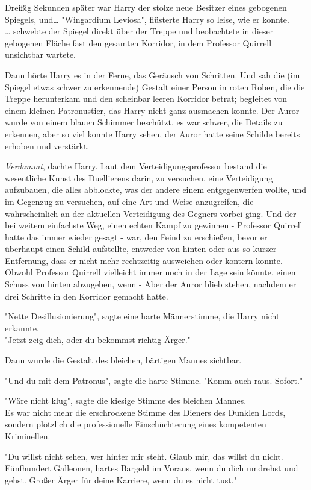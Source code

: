 {Dreißig Sekunden später war Harry der stolze neue Besitzer eines gebogenen Spiegels, und… "Wingardium Leviosa", flüsterte Harry so leise, wie er konnte.\\ … schwebte der Spiegel direkt über der Treppe und beobachtete in dieser gebogenen Fläche fast den gesamten Korridor, in dem Professor Quirrell unsichtbar wartete.

Dann hörte Harry es in der Ferne, das Geräusch von Schritten. Und sah die (im Spiegel etwas schwer zu erkennende) Gestalt einer Person in roten Roben, die die Treppe herunterkam und den scheinbar leeren Korridor betrat; begleitet von einem kleinen Patronustier, das Harry nicht ganz ausmachen konnte. Der Auror wurde von einem blauen Schimmer beschützt, es war schwer, die Details zu erkennen, aber so viel konnte Harry sehen, der Auror hatte seine Schilde bereits erhoben und verstärkt.

\emph{Verdammt}, dachte Harry. Laut dem Verteidigungsprofessor bestand die wesentliche Kunst des Duellierens darin, zu versuchen, eine Verteidigung aufzubauen, die alles abblockte, was der andere einem entgegenwerfen wollte, und im Gegenzug zu versuchen, auf eine Art und Weise anzugreifen, die wahrscheinlich an der aktuellen Verteidigung des Gegners vorbei ging. Und der bei weitem einfachste Weg, einen echten Kampf zu gewinnen - Professor Quirrell hatte das immer wieder gesagt - war, den Feind zu erschießen, bevor er überhaupt einen Schild aufstellte, entweder von hinten oder aus so kurzer Entfernung, dass er nicht mehr rechtzeitig ausweichen oder kontern konnte. Obwohl Professor Quirrell vielleicht immer noch in der Lage sein könnte, einen Schuss von hinten abzugeben, wenn - Aber der Auror blieb stehen, nachdem er drei Schritte in den Korridor gemacht hatte.

"Nette Desillusionierung", sagte eine harte Männerstimme, die Harry nicht erkannte.\\ "Jetzt zeig dich, oder du bekommst richtig Ärger."

Dann wurde die Gestalt des bleichen, bärtigen Mannes sichtbar.

"Und du mit dem Patronus", sagte die harte Stimme. "Komm auch raus. Sofort."

"Wäre nicht klug", sagte die kiesige Stimme des bleichen Mannes.\\ Es war nicht mehr die erschrockene Stimme des Dieners des Dunklen Lords, sondern plötzlich die professionelle Einschüchterung eines kompetenten Kriminellen.

"Du willst nicht sehen, wer hinter mir steht. Glaub mir, das willst du nicht. Fünfhundert Galleonen, hartes Bargeld im Voraus, wenn du dich umdrehst und gehst. Großer Ärger für deine Karriere, wenn du es nicht tust."

}
